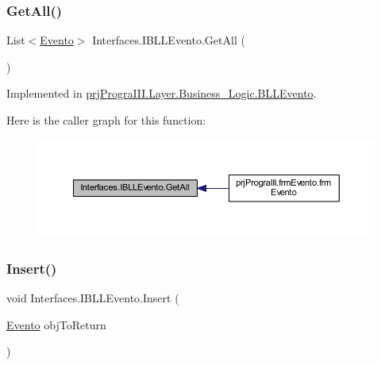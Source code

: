 \subsubsection{\texorpdfstring{Get\+All()}{GetAll()}}
{\footnotesize\ttfamily List$<$\hyperlink{classprj_progra_i_i_i_1_1_layer_1_1_entities_1_1_evento}{Evento}$>$ Interfaces.\+I\+B\+L\+L\+Evento.\+Get\+All (\begin{DoxyParamCaption}{ }\end{DoxyParamCaption})}



Implemented in \hyperlink{classprj_progra_i_i_i_1_1_layer_1_1_business___logic_1_1_b_l_l_evento_a5b9114ece4753c247a3ad365ca543da2}{prj\+Progra\+I\+I\+I.\+Layer.\+Business\+\_\+\+Logic.\+B\+L\+L\+Evento}.

Here is the caller graph for this function\+:
\nopagebreak
\begin{figure}[H]
\begin{center}
\leavevmode
\includegraphics[width=350pt]{interface_interfaces_1_1_i_b_l_l_evento_a2573cdfaf0097cfcf185b39ddaede2d8_icgraph}
\end{center}
\end{figure}
\hypertarget{interface_interfaces_1_1_i_b_l_l_evento_ad26c4dba0bce0ce649b1e68e21cc194a}{}\label{interface_interfaces_1_1_i_b_l_l_evento_ad26c4dba0bce0ce649b1e68e21cc194a} 
\subsubsection{\texorpdfstring{Insert()}{Insert()}}
{\footnotesize\ttfamily void Interfaces.\+I\+B\+L\+L\+Evento.\+Insert (\begin{DoxyParamCaption}\item[{\hyperlink{classprj_progra_i_i_i_1_1_layer_1_1_entities_1_1_evento}{Evento}}]{obj\+To\+Return }\end{DoxyParamCaption})}



